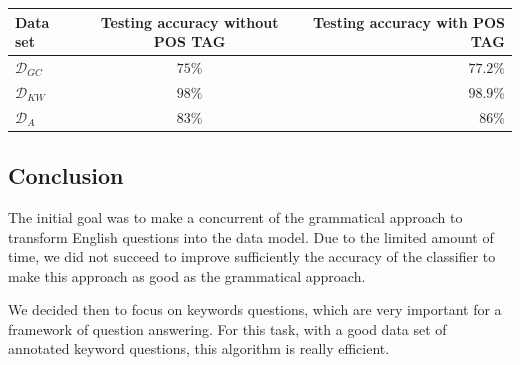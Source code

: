 \begin{center}
\begin{tabular}{|l|c|r|}
  \hline
  Data set & Testing accuracy without POS TAG & Testing accuracy with POS TAG \\
  \hline
  $\mathcal{D}_{GC}$ &  $75\%$& $77.2\%$  \\
  $\mathcal{D}_{KW}$ & $98\%$ & $98.9\%$ \\
  $\mathcal{D}_{A}$    & $83\%$ & $86\%$ \\
  \hline
\end{tabular}
\end{center}


\subsection{Conclusion}

The initial goal was to make a concurrent of the grammatical approach to transform English questions into the data model. Due to the limited amount of time, we did not succeed to improve sufficiently the accuracy of the classifier to make this approach as good as the grammatical approach.

We decided then to focus on keywords questions, which are very important for a framework of question answering. For this task, with a good data set of annotated keyword questions, this algorithm is really efficient.

